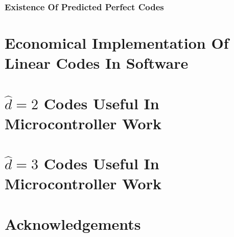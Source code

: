 \subsubsection{Existence Of Predicted Perfect Codes}
\label{cedc0:scob0:spfc0:sepc0}


\section{Economical Implementation Of Linear Codes In Software}
\label{cedc0:seim0}


\section[\protect\mbox{\protect$\hat{d}=2$} Codes Useful In Microcontroller Work]
        {\protect\mbox{\protect\boldmath$\hat{d}=2$} Codes Useful In Microcontroller Work}
\label{cedc0:sdtc0}


\section[\protect\mbox{\protect$\hat{d}=3$} Codes Useful In Microcontroller Work]
        {\protect\mbox{\protect\boldmath$\hat{d}=3$} Codes Useful In Microcontroller Work}
\label{cedc0:sdhc0}



\section{Acknowledgements}
\label{cedc0:sack0}

